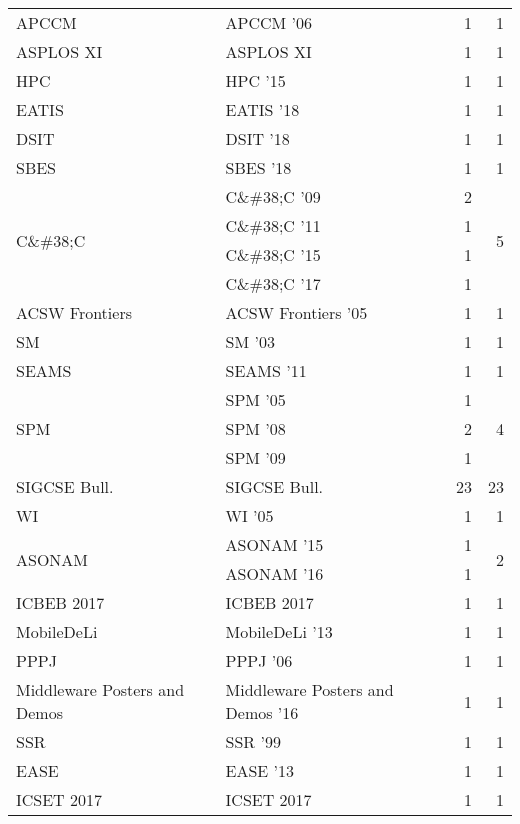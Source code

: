 \begin{table*}[t]
\begin{tabular}{llrr}
\multirow{1}{*}{APCCM } & APCCM '06 & 1 & \multirow{1}{*}{1}\\
\multirow{1}{*}{ASPLOS XI} & ASPLOS XI & 1 & \multirow{1}{*}{1}\\
\multirow{1}{*}{HPC } & HPC '15 & 1 & \multirow{1}{*}{1}\\
\multirow{1}{*}{EATIS } & EATIS '18 & 1 & \multirow{1}{*}{1}\\
\multirow{1}{*}{DSIT } & DSIT '18 & 1 & \multirow{1}{*}{1}\\
\multirow{1}{*}{SBES } & SBES '18 & 1 & \multirow{1}{*}{1}\\
\multirow{4}{*}{C\&\#38;C } & C\&\#38;C '09 & 2 & \multirow{4}{*}{5}\\
& C\&\#38;C '11 & 1 &\\
& C\&\#38;C '15 & 1 &\\
& C\&\#38;C '17 & 1 &\\
\multirow{1}{*}{ACSW Frontiers } & ACSW Frontiers '05 & 1 & \multirow{1}{*}{1}\\
\multirow{1}{*}{SM } & SM '03 & 1 & \multirow{1}{*}{1}\\
\multirow{1}{*}{SEAMS } & SEAMS '11 & 1 & \multirow{1}{*}{1}\\
\multirow{3}{*}{SPM } & SPM '05 & 1 & \multirow{3}{*}{4}\\
& SPM '08 & 2 &\\
& SPM '09 & 1 &\\
\multirow{1}{*}{SIGCSE Bull.} & SIGCSE Bull. & 23 & \multirow{1}{*}{23}\\
\multirow{1}{*}{WI } & WI '05 & 1 & \multirow{1}{*}{1}\\
\multirow{2}{*}{ASONAM } & ASONAM '15 & 1 & \multirow{2}{*}{2}\\
& ASONAM '16 & 1 &\\
\multirow{1}{*}{ICBEB 2017} & ICBEB 2017 & 1 & \multirow{1}{*}{1}\\
\multirow{1}{*}{MobileDeLi } & MobileDeLi '13 & 1 & \multirow{1}{*}{1}\\
\multirow{1}{*}{PPPJ } & PPPJ '06 & 1 & \multirow{1}{*}{1}\\
\multirow{1}{*}{Middleware Posters and Demos } & Middleware Posters and Demos '16 & 1 & \multirow{1}{*}{1}\\
\multirow{1}{*}{SSR } & SSR '99 & 1 & \multirow{1}{*}{1}\\
\multirow{1}{*}{EASE } & EASE '13 & 1 & \multirow{1}{*}{1}\\
\multirow{1}{*}{ICSET 2017} & ICSET 2017 & 1 & \multirow{1}{*}{1}\\

\end{tabular}
\end{table*}
